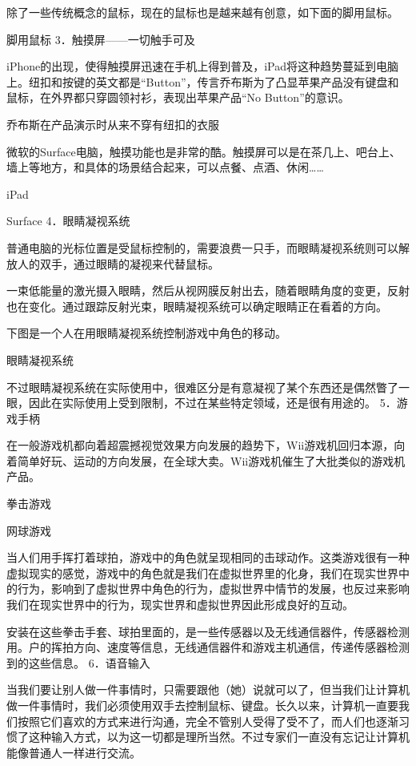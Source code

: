 \documentclass[12pt,UTF8]{ctexbook}
\begin{document}
除了一些传统概念的鼠标，现在的鼠标也是越来越有创意，如下面的脚用鼠标。

脚用鼠标
3．触摸屏——一切触手可及

iPhone的出现，使得触摸屏迅速在手机上得到普及，iPad将这种趋势蔓延到电脑上。纽扣和按键的英文都是“Button”，传言乔布斯为了凸显苹果产品没有键盘和鼠标，在外界都只穿圆领衬衫，表现出苹果产品“No Button”的意识。

乔布斯在产品演示时从来不穿有纽扣的衣服

微软的Surface电脑，触摸功能也是非常的酷。触摸屏可以是在茶几上、吧台上、墙上等地方，和具体的场景结合起来，可以点餐、点酒、休闲……

iPad

Surface
4．眼睛凝视系统

普通电脑的光标位置是受鼠标控制的，需要浪费一只手，而眼睛凝视系统则可以解放人的双手，通过眼睛的凝视来代替鼠标。

一束低能量的激光摄入眼睛，然后从视网膜反射出去，随着眼睛角度的变更，反射也在变化。通过跟踪反射光束，眼睛凝视系统可以确定眼睛正在看着的方向。

下图是一个人在用眼睛凝视系统控制游戏中角色的移动。

眼睛凝视系统

不过眼睛凝视系统在实际使用中，很难区分是有意凝视了某个东西还是偶然瞥了一眼，因此在实际使用上受到限制，不过在某些特定领域，还是很有用途的。
5．游戏手柄

在一般游戏机都向着超震撼视觉效果方向发展的趋势下，Wii游戏机回归本源，向着简单好玩、运动的方向发展，在全球大卖。Wii游戏机催生了大批类似的游戏机产品。

拳击游戏

网球游戏

当人们用手挥打着球拍，游戏中的角色就呈现相同的击球动作。这类游戏很有一种虚拟现实的感觉，游戏中的角色就是我们在虚拟世界里的化身，我们在现实世界中的行为，影响到了虚拟世界中角色的行为，虚拟世界中情节的发展，也反过来影响我们在现实世界中的行为，现实世界和虚拟世界因此形成良好的互动。

安装在这些拳击手套、球拍里面的，是一些传感器以及无线通信器件，传感器检测用。户的挥拍方向、速度等信息，无线通信器件和游戏主机通信，传递传感器检测到的这些信息。
6．语音输入

当我们要让别人做一件事情时，只需要跟他（她）说就可以了，但当我们让计算机做一件事情时，我们必须使用双手去控制鼠标、键盘。长久以来，计算机一直要我们按照它们喜欢的方式来进行沟通，完全不管别人受得了受不了，而人们也逐渐习惯了这种输入方式，以为这一切都是理所当然。不过专家们一直没有忘记让计算机能像普通人一样进行交流。
\end{document}
